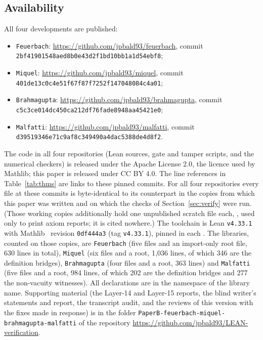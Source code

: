 \documentclass[11pt]{article}
\theoremstyle{definition}
\theoremstyle{remark}
\newcommand{\lean}[1]{\texttt{#1}}
\newcommand{\commitfeuerbach}{\texttt{2bf41901548aed8b0e43d2f1bd10bb1a1d54ebf8}}
\newcommand{\commitbrahmagupta}{\texttt{c5c3ce014dc450ca212df76fade8948aa45421e0}}
\newcommand{\commitmiquel}{\texttt{401de13c0c4e51f67f87f7252f147048084c4a01}}
\newcommand{\commitmalfatti}{\texttt{d39519346e71c9af8c349490a4dac5388de4d8f2}}
\begin{document}
\subsection{Availability}\label{sec:avail}
All four developments are published:
\begin{itemize}
\item \lean{Feuerbach}: \url{https://github.com/jpbald93/feuerbach}, commit \commitfeuerbach;
\item \lean{Miquel}: \url{https://github.com/jpbald93/miquel}, commit \commitmiquel;
\item \lean{Brahmagupta}: \url{https://github.com/jpbald93/brahmagupta}, commit \commitbrahmagupta;
\item \lean{Malfatti}: \url{https://github.com/jpbald93/malfatti}, commit \commitmalfatti.
\end{itemize}
The code in all four repositories (Lean sources, gate and tamper scripts, and the numerical
checkers) is released under the Apache License 2.0, the licence used by Mathlib; this paper is
released under CC BY 4.0.
The line references in Table~\ref{tab:thms} are links to these pinned commits. For
all four repositories every  file at these commits is byte-identical to its counterpart
in the copies from which this paper was written and on which the checks of
Section~\ref{sec:verify} were run. (Those working copies additionally hold one unpublished
scratch file each, , used only to print axiom reports; it is cited nowhere.) The toolchain is Lean \texttt{v4.33.1}~\cite{Lean4} with Mathlib~\cite{Mathlib}
revision \texttt{0df444a3} (tag \texttt{v4.33.1}), pinned in each . The
libraries, counted on those copies, are \lean{Feuerbach} (five files and an import-only root file,
630 lines in total), \lean{Miquel} (six files and a root, 1{,}036 lines, of which 346 are the
definition bridges), \lean{Brahmagupta} (four files and a root, 363 lines) and \lean{Malfatti}
(five files and a root, 984 lines, of which 202 are the definition bridges and 277 the
non-vacuity witnesses). All declarations are in the namespace of the library name.
Supporting material (the Layer-14 and Layer-15 reports, the blind writer's statements and report, the transcript audit, and the reviews of this version with the fixes made in response) is in the folder \texttt{PaperB-feuerbach-miquel-brahmagupta-malfatti} of the repository \url{https://github.com/jpbald93/LEAN-verification}.
\end{document}
